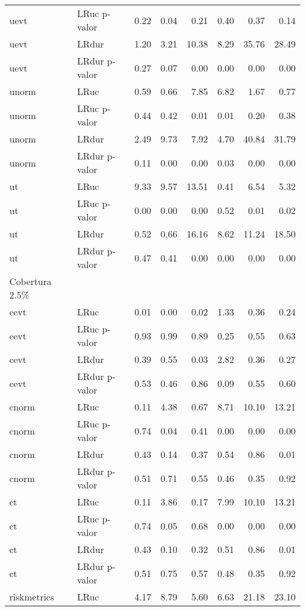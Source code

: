 \begin{longtable}{llrrrrrr}
  uevt & LRuc p-valor & 0.22 & 0.04 & 0.21 & 0.40 & 0.37 & 0.14 \\ 
  uevt & LRdur & 1.20 & 3.21 & 10.38 & 8.29 & 35.76 & 28.49 \\ 
  uevt & LRdur p-valor & 0.27 & 0.07 & 0.00 & 0.00 & 0.00 & 0.00 \\ 
  unorm & LRuc & 0.59 & 0.66 & 7.85 & 6.82 & 1.67 & 0.77 \\ 
  unorm & LRuc p-valor & 0.44 & 0.42 & 0.01 & 0.01 & 0.20 & 0.38 \\ 
  unorm & LRdur & 2.49 & 9.73 & 7.92 & 4.70 & 40.84 & 31.79 \\ 
  unorm & LRdur p-valor & 0.11 & 0.00 & 0.00 & 0.03 & 0.00 & 0.00 \\ 
  ut & LRuc & 9.33 & 9.57 & 13.51 & 0.41 & 6.54 & 5.32 \\ 
  ut & LRuc p-valor & 0.00 & 0.00 & 0.00 & 0.52 & 0.01 & 0.02 \\ 
  ut & LRdur & 0.52 & 0.66 & 16.16 & 8.62 & 11.24 & 18.50 \\ 
  ut & LRdur p-valor & 0.47 & 0.41 & 0.00 & 0.00 & 0.00 & 0.00 \\ 
  Cobertura 2.5\% &  &  &  &  &  &  &  \\ 
  cevt & LRuc & 0.01 & 0.00 & 0.02 & 1.33 & 0.36 & 0.24 \\ 
  cevt & LRuc p-valor & 0.93 & 0.99 & 0.89 & 0.25 & 0.55 & 0.63 \\ 
  cevt & LRdur & 0.39 & 0.55 & 0.03 & 2.82 & 0.36 & 0.27 \\ 
  cevt & LRdur p-valor & 0.53 & 0.46 & 0.86 & 0.09 & 0.55 & 0.60 \\ 
  cnorm & LRuc & 0.11 & 4.38 & 0.67 & 8.71 & 10.10 & 13.21 \\ 
  cnorm & LRuc p-valor & 0.74 & 0.04 & 0.41 & 0.00 & 0.00 & 0.00 \\ 
  cnorm & LRdur & 0.43 & 0.14 & 0.37 & 0.54 & 0.86 & 0.01 \\ 
  cnorm & LRdur p-valor & 0.51 & 0.71 & 0.55 & 0.46 & 0.35 & 0.92 \\ 
  ct & LRuc & 0.11 & 3.86 & 0.17 & 7.99 & 10.10 & 13.21 \\ 
  ct & LRuc p-valor & 0.74 & 0.05 & 0.68 & 0.00 & 0.00 & 0.00 \\ 
  ct & LRdur & 0.43 & 0.10 & 0.32 & 0.51 & 0.86 & 0.01 \\ 
  ct & LRdur p-valor & 0.51 & 0.75 & 0.57 & 0.48 & 0.35 & 0.92 \\ 
  riskmetrics & LRuc & 4.17 & 8.79 & 5.60 & 6.63 & 21.18 & 23.10 \\ 

\end{longtable}
